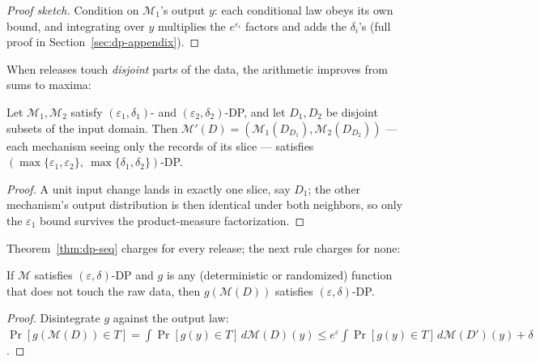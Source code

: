\begin{proof}[Proof sketch]
Condition on $\mathcal{M}_1$'s output $y$: each conditional law obeys its own bound, and
integrating over $y$ multiplies the $e^{\varepsilon_i}$ factors and adds the
$\delta_i$'s (full proof in Section~\ref{sec:dp-appendix}).
\end{proof}

When releases touch \emph{disjoint} parts of the data, the arithmetic improves from sums
to maxima:

\begin{theorem}\label{thm:dp-parallel}
Let $\mathcal{M}_1, \mathcal{M}_2$ satisfy $(\varepsilon_1,\delta_1)$- and
$(\varepsilon_2,\delta_2)$-DP, and let $D_1, D_2$ be disjoint subsets of the input
domain. Then $\mathcal{M}'(D) = (\mathcal{M}_1(D_{D_1}), \mathcal{M}_2(D_{D_2}))$ ---
each mechanism seeing only the records of its slice --- satisfies
$(\max\{\varepsilon_1,\varepsilon_2\},\ \max\{\delta_1,\delta_2\})$-DP. \eop
\end{theorem}

\begin{proof}
A unit input change lands in exactly one slice, say $D_1$; the other mechanism's output
distribution is then identical under both neighbors, so only the $\varepsilon_1$ bound
survives the product-measure factorization.
\end{proof}

Theorem~\ref{thm:dp-seq} charges for every release; the next rule charges for none:

\begin{theorem}\label{thm:dp-post}
If $\mathcal{M}$ satisfies $(\varepsilon,\delta)$-DP and $g$ is any (deterministic or
randomized) function that does not touch the raw data, then $g(\mathcal{M}(D))$
satisfies $(\varepsilon,\delta)$-DP. \eop
\end{theorem}

\begin{proof}
Disintegrate $g$ against the output law: $\Pr[g(\mathcal{M}(D)) \in T] =
\int \Pr[g(y) \in T]\, d\mathcal{M}(D)(y) \le e^{\varepsilon}
\int \Pr[g(y) \in T]\, d\mathcal{M}(D')(y) + \delta$.
\end{proof}


